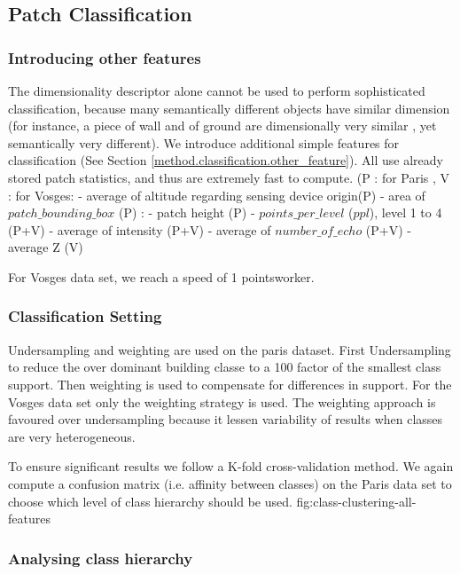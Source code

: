 	\subsection{Patch Classification}
		\label{result.classification}
		 
		\subsubsection{Introducing other features}
		The dimensionality descriptor alone cannot be used to perform sophisticated classification,
		because many semantically different objects have similar dimension 
		(for instance, a piece of wall and of ground are dimensionally very similar
		, yet semantically very different).
		We introduce additional simple features for classification (See Section \ref{method.classification.other_feature}). All use already stored patch statistics, and thus are extremely fast to compute.
		(P : for Paris , V : for Vosges: 
		- average of altitude regarding sensing device origin(P)
		- area of $patch\_bounding\_box$ (P) : 
		- patch height (P)
		- $points\_per\_level$ ($ppl$), level 1 to 4 (P+V)
		- average of intensity (P+V)
		- average of $number\_of\_echo$ (P+V) 
		- average Z (V)
		
		For Vosges data set, we reach a speed of 1 \mega points\per \second \per worker.
		\subsubsection{Classification Setting} 
		Undersampling and weighting are used on the paris dataset. First Undersampling to reduce the over dominant building classe to a 100 factor of the smallest class support. Then weighting is used to compensate for differences in support. 
		For the Vosges data set only the weighting strategy is used. 
		The weighting approach is favoured over undersampling because it lessen variability of results when classes are very heterogeneous.
		
		To ensure significant results we follow a K-fold cross-validation method. We again compute a confusion matrix (i.e. affinity between classes) on the Paris data set to choose which level of class hierarchy should be used.
		fig:class-clustering-all-features
		
		
		\subsubsection{Analysing class hierarchy} 
		
